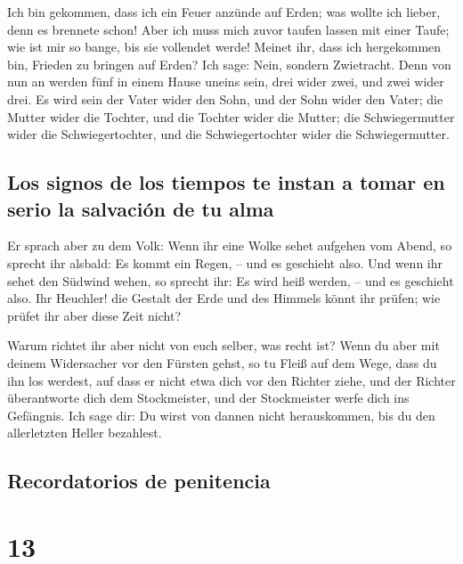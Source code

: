  Ich bin gekommen, dass ich ein Feuer anzünde auf Erden;
was wollte ich lieber, denn es brennete schon!  Aber ich
muss mich zuvor taufen lassen mit einer Taufe; wie ist mir so bange, bis
sie vollendet werde!  Meinet ihr, dass ich hergekommen
bin, Frieden zu bringen auf Erden? Ich sage: Nein, sondern Zwietracht.
 Denn von nun an werden fünf in einem Hause uneins sein,
drei wider zwei, und zwei wider drei.  Es wird sein der
Vater wider den Sohn, und der Sohn wider den Vater; die Mutter wider die
Tochter, und die Tochter wider die Mutter; die Schwiegermutter wider die
Schwiegertochter, und die Schwiegertochter wider die Schwiegermutter.

\hypertarget{los-signos-de-los-tiempos-te-instan-a-tomar-en-serio-la-salvaciuxf3n-de-tu-alma}{%
\subsection{Los signos de los tiempos te instan a tomar en serio la
salvación de tu
alma}\label{los-signos-de-los-tiempos-te-instan-a-tomar-en-serio-la-salvaciuxf3n-de-tu-alma}}

 Er sprach aber zu dem Volk: Wenn ihr eine Wolke sehet
aufgehen vom Abend, so sprecht ihr alsbald: Es kommt ein Regen, -- und
es geschieht also.  Und wenn ihr sehet den Südwind wehen,
so sprecht ihr: Es wird heiß werden, -- und es geschieht also.
 Ihr Heuchler! die Gestalt der Erde und des Himmels könnt
ihr prüfen; wie prüfet ihr aber diese Zeit nicht?

 Warum richtet ihr aber nicht von euch selber, was recht
ist?  Wenn du aber mit deinem Widersacher vor den Fürsten
gehst, so tu Fleiß auf dem Wege, dass du ihn los werdest, auf dass er
nicht etwa dich vor den Richter ziehe, und der Richter überantworte dich
dem Stockmeister, und der Stockmeister werfe dich ins Gefängnis.
 Ich sage dir: Du wirst von dannen nicht herauskommen,
bis du den allerletzten Heller bezahlest.

\hypertarget{recordatorios-de-penitencia}{%
\subsection{Recordatorios de
penitencia}\label{recordatorios-de-penitencia}}

\hypertarget{section-12}{%
\section{13}\label{section-12}}

